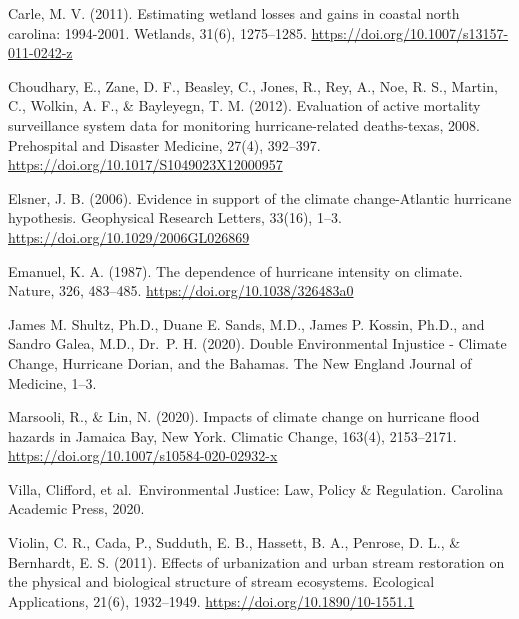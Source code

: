 \documentclass[
  12pt,
]{article}
\begin{document}
Carle, M. V. (2011). Estimating wetland losses and gains in coastal
north carolina: 1994-2001. Wetlands, 31(6), 1275--1285.
\url{https://doi.org/10.1007/s13157-011-0242-z}

Choudhary, E., Zane, D. F., Beasley, C., Jones, R., Rey, A., Noe, R. S.,
Martin, C., Wolkin, A. F., \& Bayleyegn, T. M. (2012). Evaluation of
active mortality surveillance system data for monitoring
hurricane-related deaths-texas, 2008. Prehospital and Disaster Medicine,
27(4), 392--397. \url{https://doi.org/10.1017/S1049023X12000957}

Elsner, J. B. (2006). Evidence in support of the climate change-Atlantic
hurricane hypothesis. Geophysical Research Letters, 33(16), 1--3.
\url{https://doi.org/10.1029/2006GL026869}

Emanuel, K. A. (1987). The dependence of hurricane intensity on climate.
Nature, 326, 483--485. \url{https://doi.org/10.1038/326483a0}

James M. Shultz, Ph.D., Duane E. Sands, M.D., James P. Kossin, Ph.D.,
and Sandro Galea, M.D., Dr.~P. H. (2020). Double Environmental Injustice
- Climate Change, Hurricane Dorian, and the Bahamas. The New England
Journal of Medicine, 1--3.

Marsooli, R., \& Lin, N. (2020). Impacts of climate change on hurricane
flood hazards in Jamaica Bay, New York. Climatic Change, 163(4),
2153--2171. \url{https://doi.org/10.1007/s10584-020-02932-x}

Villa, Clifford, et al.~Environmental Justice: Law, Policy \&
Regulation. Carolina Academic Press, 2020.

Violin, C. R., Cada, P., Sudduth, E. B., Hassett, B. A., Penrose, D. L.,
\& Bernhardt, E. S. (2011). Effects of urbanization and urban stream
restoration on the physical and biological structure of stream
ecosystems. Ecological Applications, 21(6), 1932--1949.
\url{https://doi.org/10.1890/10-1551.1}
\end{document}
